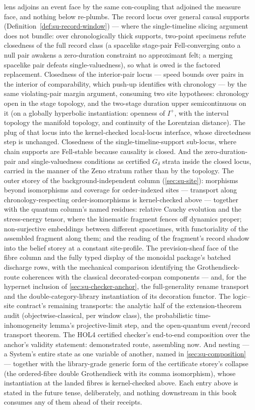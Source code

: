 lens adjoins an event face by the same con-coupling that adjoined
the measure face, and nothing below re-plumbs. The record locus over general causal
supports (Definition~\ref{def:su-record-window}) --- where the
single-timeline slicing argument does not bundle: over
chronologically thick supports, two-point specimens refute
closedness of the full record class (a spacelike stage-pair
Fell-converging onto a null pair awakens a zero-duration constraint
no approximant felt; a merging spacelike pair defeats
single-valuedness), so what is owed is the factored replacement.
Closedness of the interior-pair locus --- speed bounds over pairs in
the interior of comparability, which push-up identifies with
chronology --- by the same violating-pair margin argument, consuming
two site hypotheses: chronology open in the stage topology, and the
two-stage duration upper semicontinuous on it (on a globally
hyperbolic instantiation: openness of $I^{+}$, with the interval
topology the manifold topology, and continuity of the Lorentzian
distance). The plug of that locus into the kernel-checked
local-locus interface, whose directedness step is unchanged.
Closedness of the single-timeline-support sub-locus, where chain
supports are Fell-stable because causality is closed. And the
zero-duration-pair and single-valuedness conditions as certified
$G_\delta$ strata inside the closed locus, carried in the manner of
the Zeno stratum rather than by the topology. The outer storey of the background-independent column
(\autoref{sec:su-site}): morphisms beyond isomorphisms and
coverage for order-indexed sites --- transport along
chronology-respecting order-isomorphisms is kernel-checked above
--- together with the quantum column's named residues: relative
Cauchy evolution and the stress-energy tensor, where the kinematic
fragment fences off dynamics proper; non-surjective embeddings
between different spacetimes, with functoriality of the assembled
fragment along them; and the reading of the fragment's record
shadow into the belief storey at a constant site-profile.
The prevision-sheaf face of the
fibre
column and the fully typed display of the monoidal package's
batched discharge rows, with the mechanical comparison identifying
the Grothendieck-route coherences with the classical
decorated-cospan components --- and, for the hypernet inclusion of
\autoref{sec:su-checker-anchor}, the full-generality rename
transport and the double-category-library instantiation of its
decoration functor. The logic--site contract's
remaining
transports: the analytic half of the extension-theorem audit
(objectwise-classical, per window class), the probabilistic
time-inhomogeneity lemma's projective-limit step, and the
open-quantum event/record transport theorem. The HOL4 certified
checker's end-to-end composition over the anchor's validity
statement: demonstrated route, assembling now. And nesting --- a
System's entire state as one variable of another, named in
\autoref{sec:su-composition} --- together with the
library-grade generic form of the certificate storey's collapse
(the ordered-fibre double Grothendieck with its comma
isomorphism), whose instantiation at the landed fibres is
kernel-checked above. Each entry
above is stated in the future tense, deliberately, and nothing
downstream in this book consumes any of them ahead of their
receipts.
